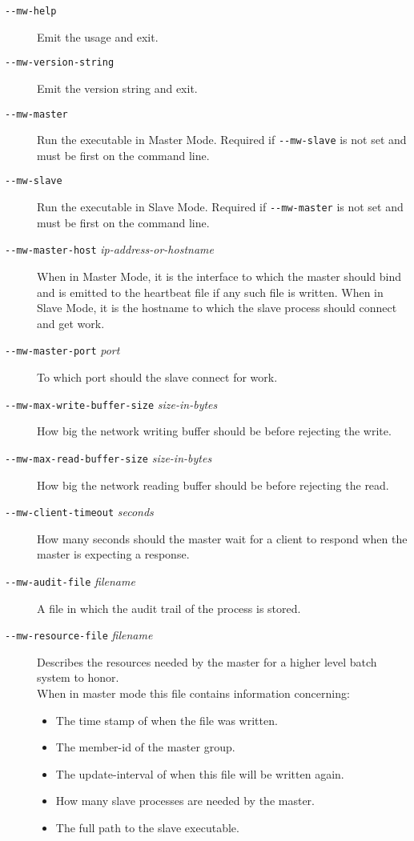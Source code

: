 \documentclass[titlepage,12pt]{book}
\newcommand{\dash}{\texttt{-}}
\newcommand{\Option}[1]{\dash\dash\texttt{#1}}
\newcommand{\OptionV}[2]{\dash\dash\texttt{#1} \textit{#2}}
\begin{document}
\begin{description}
\item[\Option{mw-help}]
    Emit the usage and exit.
\item[\Option{mw-version-string}]
    Emit the version string and exit.
\item[\Option{mw-master}]
    Run the executable in Master Mode. Required if \Option{mw-slave} is not set
	and must be first on the command line.
\item[\Option{mw-slave}]
    Run the executable in Slave Mode. Required if \Option{mw-master} is not set
	and must be first on the command line.
\item[\OptionV{mw-master-host}{ip-address-or-hostname}]
    When in Master Mode, it is the interface to which the master should
    bind and is emitted to the heartbeat file if any such file is written.
    When in Slave Mode, it is the hostname to which the slave process
    should connect and get work.
\item[\OptionV{mw-master-port}{port}]
    To which port should the slave connect for work.
\item[\OptionV{mw-max-write-buffer-size}{size-in-bytes}]
    How big the network writing buffer should be before rejecting the write.
\item[\OptionV{mw-max-read-buffer-size}{size-in-bytes}]
    How big the network reading buffer should be before rejecting the read.
\item[\OptionV{mw-client-timeout}{seconds}]
    How many seconds should the master wait for a client to respond
    when the master is expecting a response.
\item[\OptionV{mw-audit-file}{filename}]
    A file in which the audit trail of the process is stored.
\item[\OptionV{mw-resource-file}{filename}]
    Describes the resources needed by the master for a higher level batch
    system to honor.\\
	When in master mode this file contains information concerning:
	\begin{itemize}
		\item The time stamp of when the file was written.
		\item The member-id of the master group.
		\item The update-interval of when this file will be written again.
		\item How many slave processes are needed by the master.
		\item The full path to the slave executable.

\end{itemize}
\end{description}
\end{document}
